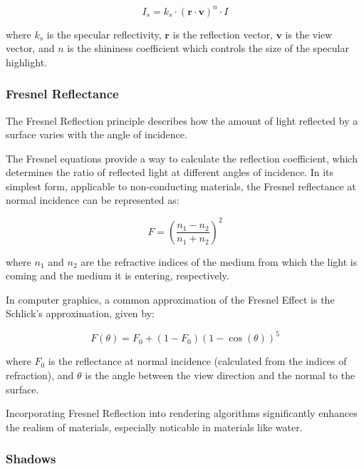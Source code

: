\begin{equation}
\label{specular}
I_s = k_s \cdot (\mathbf{r} \cdot \mathbf{v})^n \cdot I
\end{equation}

where $k_s$ is the specular reflectivity, $\mathbf{r}$ is the reflection vector, $\mathbf{v}$ is the view vector, and $n$ is the shininess coefficient which controls the size of the specular highlight.

\subsubsection{Fresnel Reflectance}
\label{Fresnel}

The Fresnel Reflection principle describes how the amount of light reflected by a surface varies with the angle of incidence. 

The Fresnel equations provide a way to calculate the reflection coefficient, which determines the ratio of reflected light at different angles of incidence. In its simplest form, applicable to non-conducting materials, the Fresnel reflectance at normal incidence can be represented as:

\begin{equation}
F = \left( \frac{n_1 - n_2}{n_1 + n_2} \right)^2
\end{equation}

where $n_1$ and  $n_2$ are the refractive indices of the medium from which the light is coming and the medium it is entering, respectively.

In computer graphics, a common approximation of the Fresnel Effect is the Schlick's approximation, given by:

\begin{equation}
\label{schlick}
F(\theta) = F_0 + (1 - F_0)(1 - \cos(\theta))^5
\end{equation}

where $F_0$  is the reflectance at normal incidence (calculated from the indices of refraction), and  $\theta$  is the angle between the view direction and the normal to the surface.

Incorporating Fresnel Reflection into rendering algorithms significantly enhances the realism of materials, especially noticable in materials like water. 

\subsubsection{Shadows}
\label{Shadows}


